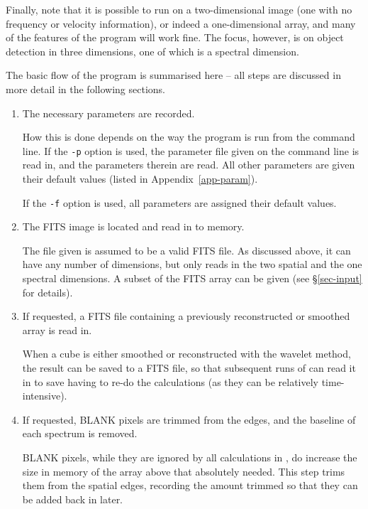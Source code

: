Finally, note that it is possible to run \duchamp on a
two-dimensional image (\ie one with no frequency or velocity
information), or indeed a one-dimensional array, and many of the
features of the program will work fine. The focus, however, is on
object detection in three dimensions, one of which is a spectral
dimension.


The basic flow of the program is summarised here -- all steps are
discussed in more detail in the following sections.
\begin{enumerate}
\item The necessary parameters are recorded.

  How this is done depends on the way the program is run from the
  command line. If the \texttt{-p} option is used, the parameter file
  given on the command line is read in, and the parameters therein are
  read. All other parameters are given their default values (listed in
  Appendix~\ref{app-param}).

  If the \texttt{-f} option is used, all parameters are assigned their
  default values.

\item The FITS image is located and read in to memory.

  The file given is assumed to be a valid FITS file. As discussed
  above, it can have any number of dimensions, but \duchamp only
  reads in the two spatial and the one spectral dimensions. A subset
  of the FITS array can be given (see \S\ref{sec-input} for details).

\item If requested, a FITS file containing a previously reconstructed
  or smoothed array is read in.

  When a cube is either smoothed or reconstructed with the \atrous
  wavelet method, the result can be saved to a FITS file, so that
  subsequent runs of \duchamp can read it in to save having to re-do
  the calculations (as they can be relatively time-intensive).

\item \label{step-blank} If requested, BLANK pixels are trimmed from
  the edges, and the baseline of each spectrum is removed.

  BLANK pixels, while they are ignored by all calculations in
  \duchamp, do increase the size in memory of the array above that
  absolutely needed. This step trims them from the spatial edges,
  recording the amount trimmed so that they can be added back in
  later.


\end{enumerate}
